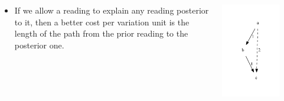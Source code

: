 \documentclass[10pt]{beamer}
\begin{document}
	\begin{frame}
		\begin{columns}
			\begin{column}{0.45\textwidth}
				\begin{itemize}
					\item If we allow a reading to explain any reading posterior to it, then a better cost per variation unit is the length of the path from the prior reading to the posterior one.
				\end{itemize}
			\end{column}
			\begin{column}{0.45\textwidth}
				\begin{center}
					\includegraphics[width=0.75\textwidth]{../img/transitivity-cost.pdf}
				\end{center}
			\end{column}
		\end{columns}
	\end{frame}
\end{document}

